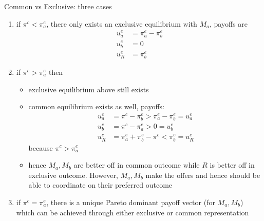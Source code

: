 \documentclass[11pt,english]{beamer}
\begin{document}
\begin{frame}[allowframebreaks]{Common vs Exclusive: three cases}
  \begin{enumerate}
  \item if $\pi^c < \pi_a^e$, there only exists an exclusive
    equilibrium with $M_a$, payoffs are
    \begin{align}
      u_a^e &= \pi_a^e-\pi_b^e \\
      u_b^e &= 0 \\
      u^e_R &= \pi_b^e
    \end{align}
  \item if $\pi^c > \pi_a^e$ then
    \begin{itemize}
    \item exclusive equilibrium above still exists
    \item common equilibrium exists as well, payoffs:
      \begin{align}
        u_a^c &= \pi^c-\pi_b^e > \pi_a^e -\pi_b^e = u_a^e \\
        u_b^c &= \pi^c-\pi_a^e > 0 = u_b^e \\
        u_R^c &= \pi_a^e +\pi_b^e - \pi^c < \pi_b^e = u_R^e
      \end{align}
      because $\pi^c > \pi_a^e$
    \item hence $M_a,M_b$ are better off in common outcome while $R$
      is better off in exclusive outcome. However, $M_a,M_b$ make the
      offers and hence should be able to coordinate on their preferred outcome
    \end{itemize}
  \item if $\pi^c=\pi_a^e$, there is a unique Pareto dominant payoff
    vector (for $M_a,M_b$) which can be achieved through either
    exclusive or common representation
  \end{enumerate}
\end{frame}
\end{document}

